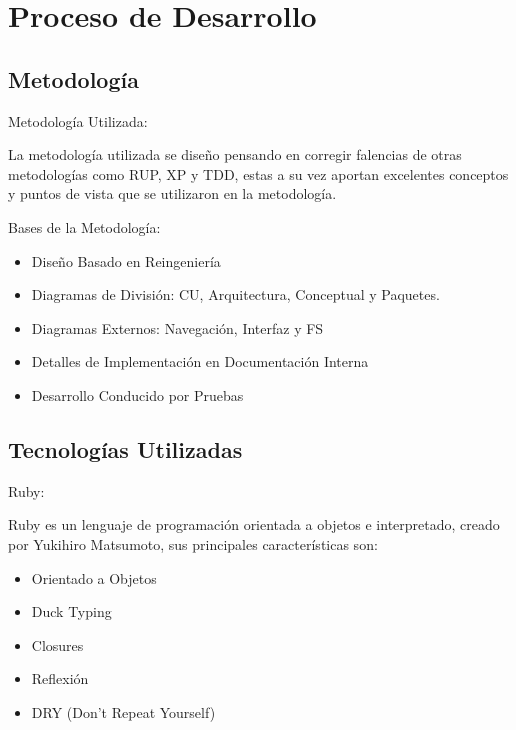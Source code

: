 \section{Proceso de Desarrollo}


\subsection{Metodología}

\begin{frame}{Metodología Utilizada:\newline}

La metodología utilizada se diseño pensando en corregir falencias de otras metodologías como RUP, XP y TDD, estas a su vez aportan excelentes conceptos y puntos de vista que se utilizaron en la metodología.

\end{frame}

\begin{frame}{Bases de la Metodología:\newline}

\begin{itemize}
	
	\item Diseño Basado en Reingeniería
	\pause
	\item Diagramas de División: CU, Arquitectura, Conceptual y Paquetes.
	\item Diagramas Externos: Navegación, Interfaz y FS
	\pause
	\item Detalles de Implementación en Documentación Interna
	\pause
	\item Desarrollo Conducido por Pruebas
	
\end{itemize}

\end{frame}


\subsection{Tecnologías Utilizadas}

\begin{frame}{Ruby:\newline}

Ruby es un lenguaje de programación orientada a objetos e interpretado, creado por Yukihiro Matsumoto, sus principales características son:\newline

\begin{itemize}
	
	\pause
	\item Orientado a Objetos
	\pause
	\item Duck Typing
	\pause
	\item Closures
	\pause
	\item Reflexión
	\pause
	\item DRY (Don't Repeat Yourself)
	
\end{itemize}

\end{frame}

